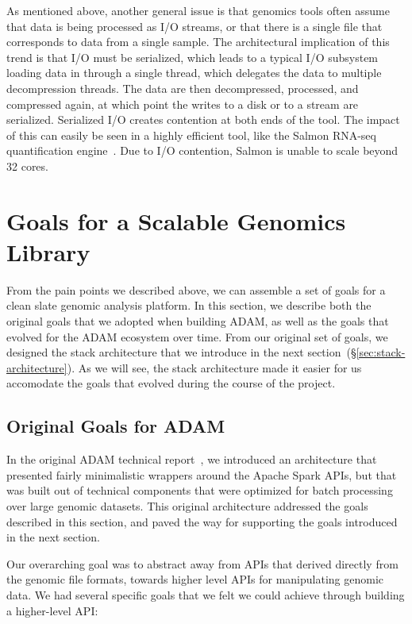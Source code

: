 \documentclass[phd]{ucbthesis}
\begin{document}
As mentioned above, another general issue is that genomics tools often assume
that data is being processed as I/O streams, or that there is a single file that
corresponds to data from a single sample. The architectural implication of this
trend is that I/O must be serialized, which leads to a typical I/O subsystem
loading data in through a single thread, which delegates the data to multiple
decompression threads. The data are then decompressed, processed, and compressed
again, at which point the writes to a disk or to a stream are serialized.
Serialized I/O creates contention at both ends of the tool. The impact of this can easily be
seen in a highly efficient tool, like the {Salmon} RNA-seq quantification
engine~\cite{patro17}. Due to I/O contention, {Salmon} is unable to scale
beyond 32 cores.

\section{Goals for a Scalable Genomics Library}
\label{sec:goals}

From the pain points we described above, we can assemble a set of goals for a
clean slate genomic analysis platform. In this section, we describe both the
original goals that we adopted when building {ADAM}, as well as the goals
that evolved for the {ADAM} ecosystem over time. From our original set
of goals, we designed the stack architecture that we introduce in the next
section~(\S\ref{sec:stack-architecture}). As we will see, the stack architecture
made it easier for us accomodate the goals that evolved during the course of
the project.

\subsection{Original Goals for {ADAM}}
\label{sec:original-goals}

In the original {ADAM} technical report~\cite{massie13}, we introduced an
architecture that presented fairly minimalistic wrappers around the
{Apache Spark} APIs, but that was built out of technical components that
were optimized for batch processing over large genomic datasets. This original
architecture addressed the goals described in this section, and paved the way
for supporting the goals introduced in the next section.

Our overarching goal was to abstract away from APIs that derived directly from
the genomic file formats, towards higher level APIs for manipulating genomic
data. We had several specific goals that we felt we could achieve through
building a higher-level API:
\end{document}
